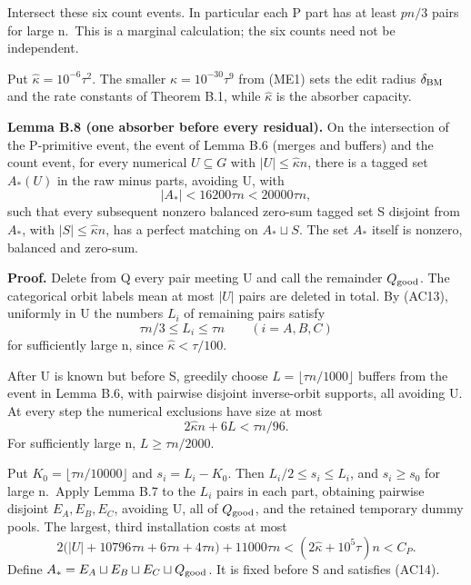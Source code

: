 \documentclass[11pt,a4paper]{article}
\newcommand{\statementstart}{\par\addvspace{6pt plus 1pt minus 1pt}\noindent}
\newcommand{\labelledparagraphstart}{\par\addvspace{3pt plus 1pt minus 1pt}\noindent}
\begin{document}
Intersect these six count events. In particular each P part has at least \(pn/3\) pairs for large n.~This is a marginal calculation; the six counts need not be independent.

Put \(\widehat\kappa=10^{-6}\tau^2\). The smaller \(\kappa=10^{-30}\tau^9\) from (ME1) sets the edit radius \(\delta_{\rm BM}\) and the rate constants of Theorem B.1, while \(\widehat\kappa\) is the absorber capacity.

\statementstart\textbf{Lemma B.8 (one absorber before every residual).} On the intersection of the P-primitive event, the event of Lemma B.6 (merges and buffers) and the count event, for every numerical \(U\subseteq G\) with \(|U|\le\widehat\kappa n\), there is a tagged set \(A_*(U)\) in the raw minus parts, avoiding U, with \begin{equation}
|A_*|<16200\tau n<20000\tau n,
\tag{AC14}\label{eq:AC14}
\end{equation} such that every subsequent nonzero balanced zero-sum tagged set S disjoint from \(A_*\), with \(|S|\le\widehat\kappa n\), has a perfect matching on \(A_*\sqcup S\). The set \(A_*\) itself is nonzero, balanced and zero-sum.

\labelledparagraphstart\textbf{Proof.} Delete from Q every pair meeting U and call the remainder \(Q_{\rm good}\). The categorical orbit labels mean at most \(|U|\) pairs are deleted in total. By (AC13), uniformly in U the numbers \(L_i\) of remaining pairs satisfy \begin{equation}
\tau n/3\le L_i\le\tau n \qquad(i=A,B,C)
\tag{AC15}\label{eq:AC15}
\end{equation} for sufficiently large n, since \(\widehat\kappa<\tau/100\).

After U is known but before S, greedily choose \(L=\lfloor\tau n/1000\rfloor\) buffers from the event in Lemma B.6, with pairwise disjoint inverse-orbit supports, all avoiding U. At every step the numerical exclusions have size at most \begin{equation}
2\widehat\kappa n+6L<\tau n/96.
\tag{AC15a}\label{eq:AC15a}
\end{equation} For sufficiently large n, \(L\ge\tau n/2000\).

Put \(K_0=\lfloor\tau n/10000\rfloor\) and \(s_i=L_i-K_0\). Then \(L_i/2\le s_i\le L_i\), and \(s_i\ge s_0\) for large n.~Apply Lemma B.7 to the \(L_i\) pairs in each part, obtaining pairwise disjoint \(E_A,E_B,E_C\), avoiding U, all of \(Q_{\rm good}\), and the retained temporary dummy pools. The largest, third installation costs at most \begin{equation}
2\bigl(|U|+10796\tau n+6\tau n+4\tau n\bigr)+11000\tau n
 < (2\widehat\kappa+10^5\tau)n<C_P.
\tag{AC16}\label{eq:AC16}
\end{equation} Define \(A_*=E_A\sqcup E_B\sqcup E_C\sqcup Q_{\rm good}\). It is fixed before S and satisfies (AC14).
\end{document}

